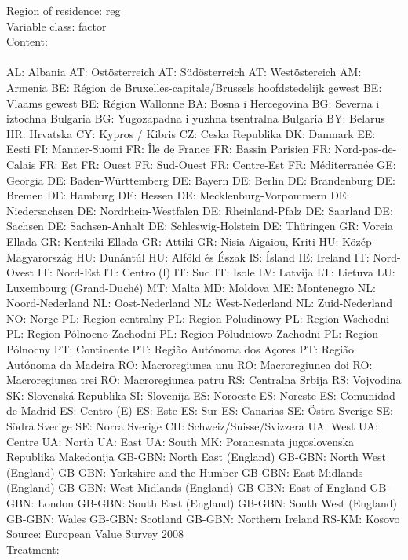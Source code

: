 \documentclass[preprint,12pt,authoryear]{elsarticle}
\begin{document}
Region of residence: reg \\ \noindent\hspace*{10mm}%
	Variable class: factor \\ \noindent\hspace*{10mm}%
	Content: \\ \noindent\hspace*{20mm}%
		\\ \noindent\hspace*{20mm}%
		AL: Albania
		AT: Ostösterreich
		AT: Südösterreich
		AT: Westöstereich
		AM: Armenia
		BE: Région de Bruxelles-capitale/Brussels hoofdstedelijk gewest
		BE: Vlaams gewest
		BE: Région Wallonne
		BA: Bosna i Hercegovina
		BG: Severna i iztochna Bulgaria
		BG: Yugozapadna i yuzhna tsentralna Bulgaria
		BY: Belarus
		HR: Hrvatska
		CY: Kypros / Kibris
		CZ: Ceska Republika
		DK: Danmark
		EE: Eesti
		FI: Manner-Suomi
		FR: Île de France
		FR: Bassin Parisien
		FR: Nord-pas-de-Calais
		FR: Est
		FR: Ouest
		FR: Sud-Ouest
		FR: Centre-Est
		FR: Méditerranée
		GE: Georgia
		DE: Baden-Württemberg
		DE: Bayern
		DE: Berlin
		DE: Brandenburg
		DE: Bremen
		DE: Hamburg
		DE: Hessen
		DE: Mecklenburg-Vorpommern
		DE: Niedersachsen
		DE: Nordrhein-Westfalen
		DE: Rheinland-Pfalz
		DE: Saarland
		DE: Sachsen
		DE: Sachsen-Anhalt
		DE: Schleswig-Holstein
		DE: Thüringen
		GR: Voreia Ellada
		GR: Kentriki Ellada
		GR: Attiki
		GR: Nisia Aigaiou, Kriti
		HU: Közép-Magyarország
		HU: Dunántúl
		HU: Alföld és Észak
		IS: Ísland
		IE: Ireland
		IT: Nord-Ovest
		IT: Nord-Est
		IT: Centro (l)
		IT: Sud
		IT: Isole
		LV: Latvija
		LT: Lietuva
		LU: Luxembourg (Grand-Duché)
		MT: Malta
		MD: Moldova
		ME: Montenegro
		NL: Noord-Nederland
		NL: Oost-Nederland
		NL: West-Nederland
		NL: Zuid-Nederland
		NO: Norge
		PL: Region centralny
		PL: Region Poludinowy
		PL: Region Wschodni
		PL: Region Pólnocno-Zachodni
		PL: Region Póludniowo-Zachodni
		PL: Region Pólnocny
		PT: Continente
		PT: Região Autónoma dos Açores
		PT: Região Autónoma da Madeira
		RO: Macroregiunea unu
		RO: Macroregiunea doi
		RO: Macroregiunea trei
		RO: Macroregiunea patru
		RS: Centralna Srbija
		RS: Vojvodina
		SK: Slovenská Republika
		SI: Slovenija
		ES: Noroeste
		ES: Noreste
		ES: Comunidad de Madrid
		ES: Centro (E)
		ES: Este
		ES: Sur
		ES: Canarias
		SE: Östra Sverige
		SE: Södra Sverige
		SE: Norra Sverige
		CH: Schweiz/Suisse/Svizzera
		UA: West
		UA: Centre
		UA: North
		UA: East
		UA: South
		MK: Poranesnata jugoslovenska Republika Makedonija
		GB-GBN: North East (England)
		GB-GBN: North West (England)
		GB-GBN: Yorkshire and the Humber
		GB-GBN: East Midlands (England)
		GB-GBN: West Midlands (England)
		GB-GBN: East of England
		GB-GBN: London
		GB-GBN: South East (England)
		GB-GBN: South West (England)
		GB-GBN: Wales
		GB-GBN: Scotland
		GB-GBN: Northern Ireland
		RS-KM: Kosovo\\ 
		\noindent\hspace*{10mm}%
	Source: European Value Survey 2008\\ \noindent\hspace*{10mm}%
	Treatment: \\
\end{document}
